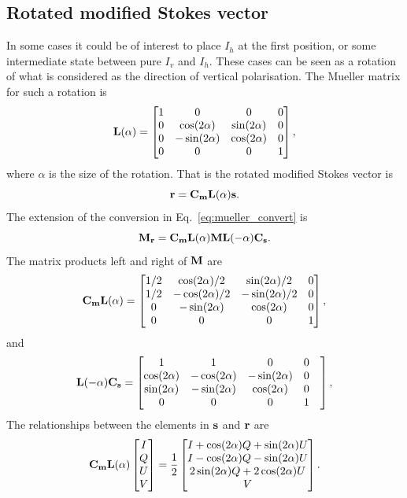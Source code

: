 \subsection{Rotated modified Stokes vector}
%
In some cases it could be of interest to place $I_h$ at the first position, or
some intermediate state between pure $I_v$ and $I_h$. These cases can be seen
as a rotation of what is considered as the direction of vertical polarisation.
The Mueller matrix for such a rotation is
\begin{equation}
  \mathbf{L}(\alpha) = \begin{bmatrix}
    1&0&0&0\\
    0&\cos(2\alpha)&\sin(2\alpha)&0\\
    0&-\sin(2\alpha)&\cos(2\alpha)&0\\
    0&0&0&1
  \end{bmatrix},
\end{equation}
where $\alpha$ is the size of the rotation. That is the rotated
modified Stokes vector is
\begin{equation}
  \mathbf{r} = \mathbf{C_mL}(\alpha)\mathbf{s}.
\end{equation}
The extension of the conversion in Eq.~\ref{eq:mueller_convert} is
\begin{equation}
  \mathbf{M_r} = \mathbf{C_mL(\alpha)ML(-\alpha)C_s}.
\end{equation}
The matrix products left and right of $\mathbf{M}$ are 
\begin{equation}
  \mathbf{C_mL(\alpha)} = \begin{bmatrix}
    1/2&\cos(2\alpha)/2&\sin(2\alpha)/2&0\\
    1/2&-\cos(2\alpha)/2&-\sin(2\alpha)/2&0\\
    0&-\sin(2\alpha)&\cos(2\alpha)&0\\
    0&0&0&1
  \end{bmatrix},
\end{equation}
and
\begin{equation}
  \mathbf{L(-\alpha)C_s} = \begin{bmatrix}
    1&1&0&0\\
    \cos(2\alpha)&-\cos(2\alpha)&-\sin(2\alpha)&0\\
    \sin(2\alpha)&-\sin(2\alpha)&\cos(2\alpha)&0&\\
    0&0&0&1
  \end{bmatrix},
\end{equation}
The relationships between the elements in $\mathbf{s}$ and $\mathbf{r}$ are 
\begin{equation}
  \mathbf{C_mL(\alpha)}
  \begin{bmatrix} I\\Q\\U\\V \end{bmatrix} =
  \frac{1}{2}\begin{bmatrix}
    I+\cos(2\alpha)Q+\sin(2\alpha)U\\
    I-\cos(2\alpha)Q-\sin(2\alpha)U\\
    2\sin(2\alpha)Q+2\cos(2\alpha)U\\
    V
  \end{bmatrix}.
\end{equation}
